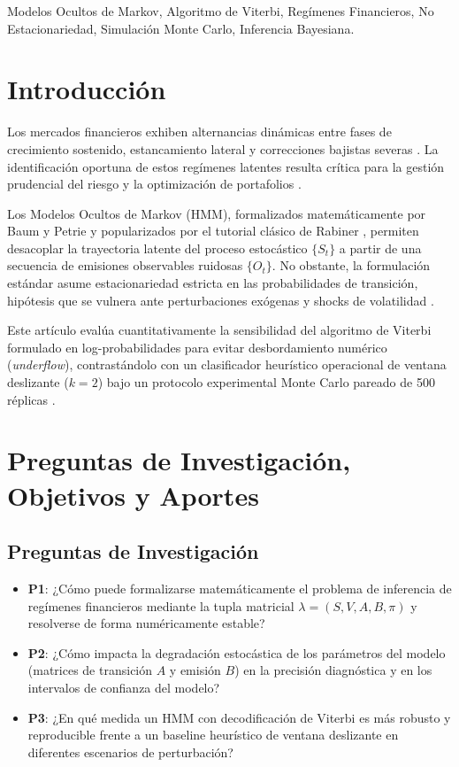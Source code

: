 \documentclass[conference,10pt,twocolumn]{IEEEtran}
\begin{document}
\begin{IEEEkeywords}
Modelos Ocultos de Markov, Algoritmo de Viterbi, Regímenes Financieros, No Estacionariedad, Simulación Monte Carlo, Inferencia Bayesiana.
\end{IEEEkeywords}

\section{Introducción}
Los mercados financieros exhiben alternancias dinámicas entre fases de crecimiento sostenido, estancamiento lateral y correcciones bajistas severas \cite{hamilton1989}. La identificación oportuna de estos regímenes latentes resulta crítica para la gestión prudencial del riesgo y la optimización de portafolios \cite{guidolin2007}.

Los Modelos Ocultos de Markov (HMM), formalizados matemáticamente por Baum y Petrie \cite{baum1966} y popularizados por el tutorial clásico de Rabiner \cite{rabiner1989}, permiten desacoplar la trayectoria latente del proceso estocástico $\{S_t\}$ a partir de una secuencia de emisiones observables ruidosas $\{O_t\}$. No obstante, la formulación estándar asume estacionariedad estricta en las probabilidades de transición, hipótesis que se vulnera ante perturbaciones exógenas y shocks de volatilidad \cite{ang2002, cont2001}.

Este artículo evalúa cuantitativamente la sensibilidad del algoritmo de Viterbi \cite{viterbi1967} formulado en log-probabilidades para evitar desbordamiento numérico (\textit{underflow}), contrastándolo con un clasificador heurístico operacional de ventana deslizante ($k=2$) bajo un protocolo experimental Monte Carlo pareado de 500 réplicas \cite{glasserman2003}.

\section{Preguntas de Investigación, Objetivos y Aportes}

\subsection{Preguntas de Investigación}
\begin{itemize}
    \item \textbf{P1}: ¿Cómo puede formalizarse matemáticamente el problema de inferencia de regímenes financieros mediante la tupla matricial $\lambda = (S, V, A, B, \pi)$ y resolverse de forma numéricamente estable?
    \item \textbf{P2}: ¿Cómo impacta la degradación estocástica de los parámetros del modelo (matrices de transición $A$ y emisión $B$) en la precisión diagnóstica y en los intervalos de confianza del modelo?
    \item \textbf{P3}: ¿En qué medida un HMM con decodificación de Viterbi es más robusto y reproducible frente a un baseline heurístico de ventana deslizante en diferentes escenarios de perturbación?
\end{itemize}
\end{document}
